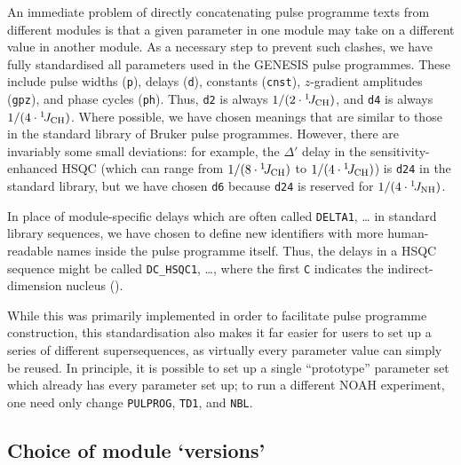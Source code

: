 \documentclass[a4paper,11pt]{article}
\newcommand{\carbon}{\ce{^{13}C}}
\newcommand{\onejch}{{}^1\!J_{\ce{CH}}}
\newcommand{\onejnh}{{}^1\!J_{\ce{NH}}}
\begin{document}
An immediate problem of directly concatenating pulse programme texts from different modules is that a given parameter in one module may take on a different value in another module.
As a necessary step to prevent such clashes, we have fully standardised all parameters used in the GENESIS pulse programmes.
These include pulse widths (\texttt{p}), delays (\texttt{d}), constants (\texttt{cnst}), $z$-gradient amplitudes (\texttt{gpz}), and phase cycles (\texttt{ph}).
Thus, \texttt{d2} is always $1 / (2 \cdot \onejch)$, and \texttt{d4} is always $1 / (4 \cdot \onejch)$.
Where possible, we have chosen meanings that are similar to those in the standard library of Bruker pulse programmes.
However, there are invariably some small deviations: for example, the $\Delta'$ delay in the \carbon{} sensitivity-enhanced HSQC (which can range from $1/(8 \cdot\onejch)$ to $1/(4 \cdot\onejch)$) is \texttt{d24} in the standard library, but we have chosen \texttt{d6} because \texttt{d24} is reserved for $1 / (4 \cdot \onejnh)$.

In place of module-specific delays which are often called \texttt{DELTA1}, \ldots{} in standard library sequences, we have chosen to define new identifiers with more human-readable names inside the pulse programme itself.
Thus, the delays in a HSQC sequence might be called \texttt{DC\_HSQC1}, \ldots{}, where the first \texttt{C} indicates the indirect-dimension nucleus (\carbon{}).

While this was primarily implemented in order to facilitate pulse programme construction, this standardisation also makes it far easier for users to set up a series of different supersequences, as virtually every parameter value can simply be reused.
In principle, it is possible to set up a single ``prototype'' parameter set which already has every parameter set up; to run a different NOAH experiment, one need only change \texttt{PULPROG}, \texttt{TD1}, and \texttt{NBL}.

\subsection{Choice of module `versions'}
\end{document}
